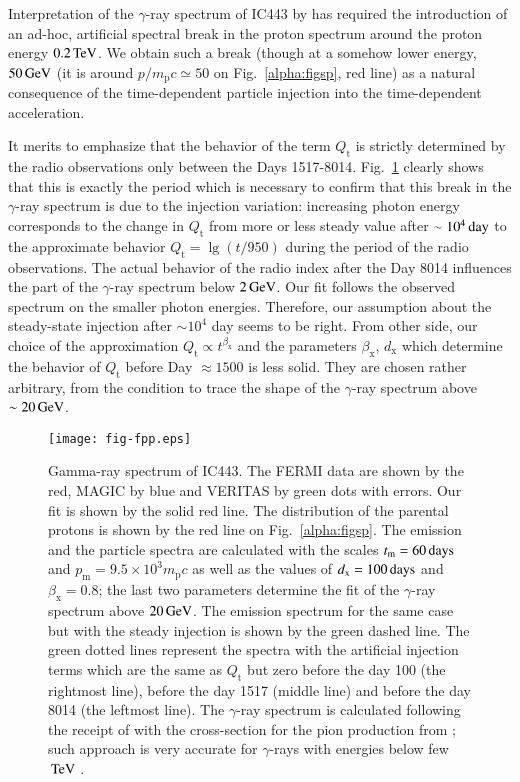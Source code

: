 \documentclass{aa}
\newcommand\un[1]{{\,\rm #1}}
\newcommand\E[1]{\times10^{#1}}
\newcommand\rs[1]{_\mathrm{#1}}
\newcommand\g{$\gamma$}
\begin{document}
Interpretation of the \g-ray spectrum of IC443 by \citet[][their Fig.~3]{Ackermann-etal-2013} has required the introduction of an ad-hoc, artificial spectral break in the proton spectrum around the proton energy $0.2\un{TeV}$. We obtain such a break (though at a somehow lower energy, $50\un{GeV}$ (it is around $p/m\rs{p}c\simeq 50$ on  Fig.~\ref{alpha:figsp}, red line) as a natural consequence of the time-dependent particle injection into the time-dependent acceleration. 

It merits to emphasize that the behavior of the term $Q\rs{t}$ is strictly determined by the radio observations only between the Days 1517-8014. Fig.~\ref{alpha:figfpp} clearly shows that this is exactly the period which is necessary to confirm that this break in the \g-ray spectrum is due to the injection variation: increasing photon energy corresponds to the change in $Q\rs{t}$ from more or less steady value after $\sim 10^4\un{day}$ to the approximate behavior $Q\rs{t}=\lg(t/950)$ during the period of the radio observations. The actual behavior of the radio index after the Day 8014 influences the part of the \g-ray spectrum below $2\un{GeV}$. 
Our fit follows the observed spectrum on the smaller photon energies. Therefore, our assumption about the steady-state injection after $\sim 10^4$ day seems to be right. 
From other side, our choice of the approximation $Q\rs{t}\propto t^{\beta\rs{x}}$ and the parameters $\beta\rs{x}$, $d\rs{x}$ which determine the behavior of $Q\rs{t}$ before Day $\approx 1500$ is less solid. They are chosen rather arbitrary, from the condition to trace the shape of the \g-ray spectrum above $\sim 20\un{GeV}$.

\begin{figure}
 \centering
 \texttt{[image: fig-fpp.eps]}
 \caption{Gamma-ray spectrum of IC443.  
The FERMI data are shown by the red, MAGIC by blue and VERITAS by green dots with errors.    
Our fit is shown by the solid red line. The distribution of the parental protons is shown by the red line on Fig.~\ref{alpha:figsp}. The emission and the particle spectra are calculated with the scales $t\rs{m}=60\un{days}$ and $p\rs{m}=9.5\E{3}m\rs{p}c$ as well as the values of $d\rs{x}=100\un{days}$ and $\beta\rs{x}=0.8$; the last two parameters determine the fit of the \g-ray spectrum above $20\un{GeV}$. The emission spectrum for the same case but with the steady injection is shown by the green dashed line. The green dotted lines represent the spectra with the artificial injection terms which are the same as $Q\rs{t}$ but zero before the day 100 (the rightmost line), before the day 1517 (middle line) and before the day 8014 (the leftmost line). 
The \g-ray spectrum is calculated following the receipt of \citet{Aharonian-Atoyan-2000} with the cross-section for the pion production from \citet{Kelner-etal-2006}; such approach is  very accurate for \g-rays with energies below few $\un{TeV}$ \citep{Kelner-etal-2006}. 
               }
 \label{alpha:figfpp}
\end{figure}
\end{document}

